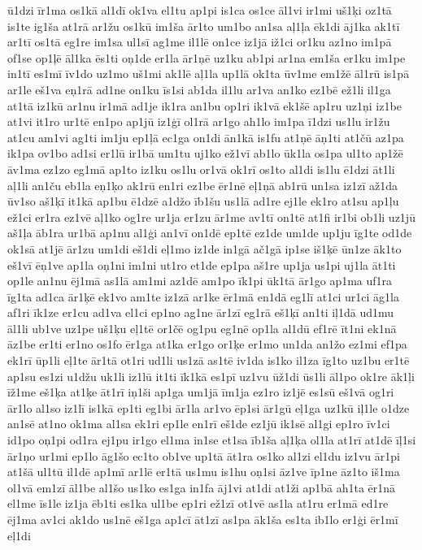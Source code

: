 {ū1dzi
īr1ma
os1kā
al1dī
ok1va
el1tu
ap1pi
is1ca
os1ce
āl1vi
ir1mi
uš1ķi
oz1tā
is1te
ig1ša
at1rā
ar1žu
os1kū
im1ša
ār1to
um1bo
an1sa
aļ1ļa
ēk1di
āj1ka
ak1tī
ar1tī
os1tā
eg1re
im1sa
ul1sī
ag1me
il1lē
on1ce
iz1jā
iž1ci
or1ku
az1no
im1pā
of1se
op1ļē
āl1ka
ēs1ti
oņ1de
er1la
ār1ņē
uz1ku
ab1pi
ar1na
em1ša
er1ku
im1pe
in1tī
es1mī
īv1do
uz1mo
uš1mi
ak1lē
aļ1la
up1lā
ok1ta
ūv1me
em1žē
āl1rū
is1pā
ar1le
eš1va
eņ1rā
ad1ne
on1ku
īs1si
ab1da
il1lu
ar1va
an1ko
ez1bē
ež1li
il1ga
at1tā
iz1kū
ar1nu
ir1mā
ad1je
ik1ra
an1bu
op1ri
ik1vā
ek1šē
ap1ru
uz1ņi
iz1be
at1vi
it1ro
ur1tē
en1po
ap1jū
iz1ģī
ol1rā
ar1go
ah1lo
im1pa
ī1dzi
us1lu
ir1žu
at1cu
am1vi
ag1ti
im1ju
ep1ļā
ec1ga
on1di
ān1kā
is1fu
at1ņē
āņ1ti
at1čū
az1pa
ik1pa
ov1bo
ad1si
er1lū
ir1bā
um1tu
uj1ko
ež1vī
ab1lo
ūk1la
os1pa
ul1to
ap1žē
āv1ma
ez1zo
eg1mā
ap1to
iz1ku
os1lu
or1vā
ok1rī
os1to
al1di
is1lu
ē1dzi
āt1li
aļ1li
an1ču
eb1la
eņ1ķo
ak1rū
en1ri
ez1be
ēr1nē
eļ1ņā
ab1rū
un1sa
iz1zī
až1da
ūv1so
aš1ķī
it1kā
ap1bu
ē1dzē
a1džo
īb1šu
us1lā
ad1re
ej1le
ek1ro
at1su
ap1ļu
ež1ci
er1ra
ez1vē
aļ1ko
og1re
ur1ja
er1zu
ār1me
av1tī
on1tē
at1fi
ir1bi
ob1li
uz1jū
aš1ļa
āb1ra
ur1bā
ap1nu
al1ģi
an1vī
on1dē
ep1tē
ez1de
um1de
up1ju
īg1te
od1de
ok1sā
at1jē
ār1zu
um1di
eš1di
eļ1mo
iz1de
in1gā
ač1gā
ip1se
iš1ķē
ūn1ze
āk1to
eš1vī
ēņ1ve
ap1la
oņ1ni
im1ni
ut1ro
et1de
ep1pa
aš1re
up1ja
us1pi
uj1la
āt1ti
op1le
an1nu
ēj1mā
as1lā
am1mi
az1dē
am1po
īk1pi
ūk1tā
ār1go
ap1ma
uf1ra
īg1ta
ad1ca
ār1ķē
ek1vo
am1te
iz1zā
ar1ke
ēr1mā
en1dā
eg1lī
at1ci
ur1ci
āg1la
af1ri
īk1ze
er1cu
ad1va
el1ci
ep1no
ag1ne
ār1zī
eg1rā
eš1ķī
an1ti
iļ1dā
ud1mu
āl1li
ub1ve
uz1pe
uš1ķu
eļ1tē
or1čē
og1pu
eg1nē
op1la
al1dū
ef1rē
īt1ni
ek1nā
āz1be
er1ti
er1no
os1fo
ēr1ga
at1ka
er1go
or1ķe
er1mo
un1da
an1žo
ez1mi
ef1pa
ek1rī
ūp1li
eļ1te
ār1tā
ot1ri
ud1li
us1zā
as1tē
iv1da
is1ko
il1za
īg1to
uz1bu
er1tē
ap1su
es1zi
u1džu
uk1li
iz1lū
it1ti
īk1kā
es1pī
uz1vu
ūž1di
ūs1li
āl1po
ok1re
āk1ļi
īž1me
eš1ķa
at1ķe
āt1rī
iņ1ši
ap1ga
um1jā
īm1ja
ez1ro
iz1jē
es1sū
eš1vā
og1ri
ār1lo
al1so
iz1lī
is1kā
ep1ti
eg1bi
ār1la
ar1vo
ēp1si
ār1gū
eļ1ga
uz1kū
iļ1le
o1dze
an1sē
at1no
ok1ma
al1sa
ek1ri
ep1le
en1rī
eš1de
ez1jū
ik1sē
al1gi
ep1ro
īv1ci
id1po
oņ1pi
od1ra
ej1pu
ir1go
el1ma
in1se
et1sa
īb1ša
aļ1ķa
ol1la
at1rī
at1dē
īļ1si
ār1ņo
ur1mi
ep1lo
āg1šo
ec1to
ob1ve
up1tā
āt1ra
os1ko
al1zi
el1du
iz1vu
ār1pi
at1šā
ul1tū
il1dē
ap1mī
ar1lē
er1tā
us1mu
is1hu
oņ1si
āz1ve
īp1ne
āz1to
iš1ma
ol1vā
em1zī
āl1be
al1šo
us1ko
es1ga
in1fa
āj1vi
at1di
at1ži
ap1bā
ah1ta
ēr1nā
el1me
īs1le
iz1ja
ēb1ti
es1ka
ul1be
ep1ri
ež1zī
ot1vē
as1la
at1ru
er1mā
ed1re
ēj1ma
av1ci
ak1do
us1nē
eš1ga
ap1cī
āt1zī
as1pa
āk1ša
es1ta
ib1lo
er1ģi
ēr1mī
eļ1di
}
